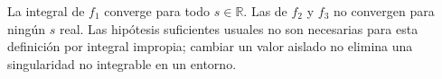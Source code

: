 La integral de \(f_1\) converge para todo \(s\in\mathbb R\). Las de \(f_2\) y \(f_3\) no convergen para ningún \(s\) real. Las hipótesis suficientes usuales no son necesarias para esta definición por integral impropia; cambiar un valor aislado no elimina una singularidad no integrable en un entorno.
